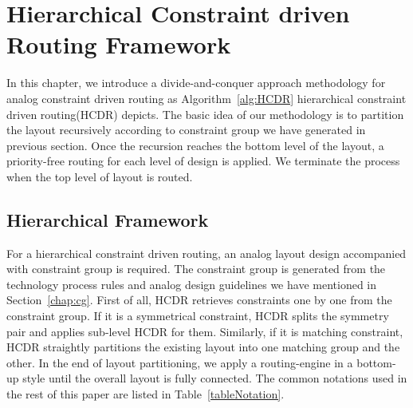 \chapter{Hierarchical Constraint driven Routing Framework}\label{chap:hcdr}
    In this chapter, we introduce a divide-and-conquer approach methodology for analog constraint driven routing as Algorithm~\ref{alg:HCDR} hierarchical constraint driven routing(HCDR) depicts. The basic idea of our methodology is to partition the layout recursively according to constraint group we have generated in previous section. Once the recursion reaches the bottom level of the layout, a priority-free routing for each level of design is applied. We terminate the process when the top level of layout is routed. 

  \section{Hierarchical Framework}\label{sec:HierFramework}

    For a hierarchical constraint driven routing, an analog layout design accompanied with constraint group is required. The constraint group is generated from the technology process rules and analog design guidelines we have mentioned in Section~\ref{chap:cg}. First of all, HCDR retrieves constraints one by one from the constraint group. If it is a symmetrical constraint, HCDR splits the symmetry pair and applies sub-level HCDR for them. Similarly, if it is matching constraint, HCDR straightly partitions the existing layout into one matching group and the other. In the end of layout partitioning, we apply a routing-engine in a bottom-up style until the overall layout is fully connected. The common notations used in the rest of this paper are listed in Table~\ref{tableNotation}.


